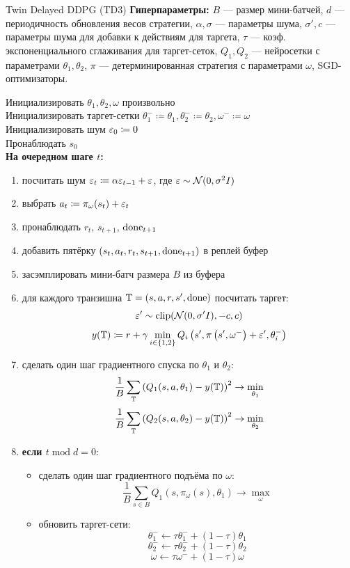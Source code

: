 \begin{algorithm}[label = TD3]{Twin Delayed DDPG (TD3)}
\textbf{Гиперпараметры:} $B$ --- размер мини-батчей, $d$ --- периодичность обновления весов стратегии, $\alpha, \sigma$ --- параметры шума, $\sigma', c$ --- параметры шума для добавки к действиям для таргета, $\tau$ --- коэф. экспоненциального сглаживания для таргет-сеток, $Q_1, Q_2$ --- нейросетки с параметрами $\theta_1, \theta_2$, $\pi$ --- детерминированная стратегия с параметрами $\omega$, SGD-оптимизаторы.

\vspace{0.3cm}
Инициализировать $\theta_1, \theta_2, \omega$ произвольно \\
Инициализировать таргет-сетки $\theta_1^- \coloneqq \theta_1, \theta_2^- \coloneqq \theta_2, \omega^- \coloneqq \omega$ \\
Инициализировать шум $\varepsilon_0 \coloneqq 0$ \\
Пронаблюдать $s_0$ \\
\textbf{На очередном шаге $t$:}
\begin{enumerate}
    \item посчитать шум $\varepsilon_{t} \coloneqq \alpha \varepsilon_{t-1} + \varepsilon$, где $\varepsilon \sim \mathcal{N}(0, \sigma^2 I)$
    \item выбрать $a_t \coloneqq \pi_\omega(s_t) + \varepsilon_{t}$
    \item пронаблюдать $r_t$,  $s_{t+1}$, $\mathrm{done}_{t+1}$
    \item добавить пятёрку $(s_t, a_t, r_t, s_{t+1}, \mathrm{done}_{t+1})$ в реплей буфер
    \item засэмплировать мини-батч размера $B$ из буфера
    \item для каждого транзишна $\mathbb{T} = (s, a, r, s', \mathrm{done})$ посчитать таргет:
    $$\varepsilon' \sim \mathrm{clip}(\mathcal{N}(0, \sigma'I), -c, c)$$
    $$y(\mathbb{T} ) \coloneqq r + \gamma \min_{i \in \{1, 2\}}Q_i\left( s', \pi \left( s', \omega^{-}\right) + \varepsilon', \theta_i^{-} \right)$$
    \item сделать один шаг градиентного спуска по $\theta_1$ и $\theta_2$:
    $$\frac{1}{B}\sum_{\mathbb{T}} \left( Q_1(s, a, \theta_1) - y(\mathbb{T} ) \right) ^2 \to \min_{\theta_1}$$
    $$\frac{1}{B}\sum_{\mathbb{T}} \left( Q_2(s, a, \theta_2) - y(\mathbb{T} ) \right) ^2 \to \min_{\theta_2}$$
    \item \textbf{если $t \operatorname{mod} d = 0$}:
    \begin{itemize}
        \item сделать один шаг градиентного подъёма по $\omega$:
        $$\frac{1}{B}\sum_{s \in B} Q_1(s, \pi_\omega(s), \theta_1) \to \max_{\omega}$$
        \item обновить таргет-сети:
        $$\theta^{-}_1 \gets \tau \theta^{-}_1 + (1 - \tau) \theta_1$$
        $$\theta^{-}_2 \gets \tau \theta^{-}_2 + (1 - \tau) \theta_2$$
        $$\omega \gets \tau \omega^{-}   + (1 - \tau) \omega$$
    \end{itemize}
\end{enumerate}
\end{algorithm}
